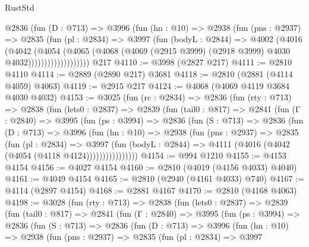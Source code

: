 \begin{lexlean}{RustStd}
\begin{coremodule}
                  @2836
                    (fun (D : @713) =>
                    @3996
                      (fun (hn : @10) =>
                      @2938
                        (fun (pns : @2937) =>
                        @2835
                          (fun (pl : @2834) =>
                          @3997
                            (fun (bodyL : @2844) =>
                            @4002
                              (@4016
                                (@4042
                                  (@4054
                                    (@4065
                                      (@4068
                                        (@4069
                                          (@2915 @3999)
                                          (@2918 @3999)
                                          @4030
                                          @4032)))))))))))))))))))
    @217
@4110 := @3998 (@2827 @217)
@4111 := @2810 @4110
@4114 := @2889 (@2890 @217) @3681
@4118 := @2810 (@2881 (@4114 @4059) @4063)
@4119 := @2915 @217
@4124 := @4068 (@4069 @4119 @3684 @4030 @4032)
@4153 := @3025
    (fun (rc : @2834) =>
    @2836
      (fun (rty : @713) =>
      @2838
        (fun (lets0 : @2837) =>
        @2839
          (fun (tail0 : @817) =>
          @2841
            (fun (Γ : @2840) =>
            @3995
              (fun (ps : @3994) =>
              @2836
                (fun (S : @713) =>
                @2836
                  (fun (D : @713) =>
                  @3996
                    (fun (hn : @10) =>
                    @2938
                      (fun (pns : @2937) =>
                      @2835
                        (fun (pl : @2834) =>
                        @3997
                          (fun (bodyL : @2844) =>
                          @4111 (@4016 (@4042 (@4054 (@4118 @4124))))))))))))))))
@4154 := @994 @1210
@4155 := @4153 @4154
@4156 := @4027 @4154
@4160 := @2810 (@4019 (@4156 @4033) @4040)
@4161 := @4049 @4154
@4165 := @2810 (@2940 (@4161 @4033) @740)
@4167 := @4114 (@2897 @4154)
@4168 := @2881 @4167
@4170 := @2810 (@4168 @4063)
@4198 := @3028
    (fun (rty : @713) =>
    @2838
      (fun (lets0 : @2837) =>
      @2839
        (fun (tail0 : @817) =>
        @2841
          (fun (Γ : @2840) =>
          @3995
            (fun (ps : @3994) =>
            @2836
              (fun (S : @713) =>
              @2836
                (fun (D : @713) =>
                @3996
                  (fun (hn : @10) =>
                  @2938
                    (fun (pns : @2937) =>
                    @2835
                      (fun (pl : @2834) =>
                      @3997

\end{coremodule}
\end{lexlean}
